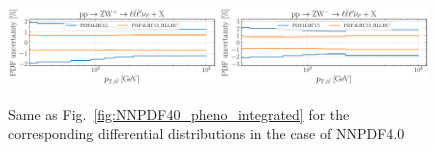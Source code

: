 \begin{figure}[htbp]
	\includegraphics[width=0.49\textwidth]{plots/LHCpheno/NNPDF_WPZ_14TEV_40_PHENO-global-HLLHC.pdf}
	\includegraphics[width=0.49\textwidth]{plots/LHCpheno/NNPDF_WMZ_14TEV_40_PHENO-global-HLLHC.pdf}
	\caption{Same as Fig.~\ref{fig:NNPDF40_pheno_integrated}
		for the corresponding differential distributions in the case of NNPDF4.0
	}
	\label{fig:HLLHC_pheno_differential}
\end{figure}